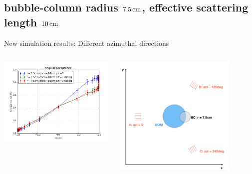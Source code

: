 \subsection{bubble-column radius $7.5\text{\,cm}$, effective scattering length $10\text{\,cm}$}
\begin{frame}[fragile]{New simulation results: Different azimuthal directions}
  \begin{columns}
    \begin{column}{0.5\textwidth}
      \includegraphics[width=\textwidth]{img/summer_scenario_r7-5cm_esca10cm}
    \end{column}
    \begin{column}{0.5\textwidth}
      \includegraphics[width=0.8\textwidth]{img/summerscenario-003}
    \end{column}
  \end{columns}


\end{frame}
